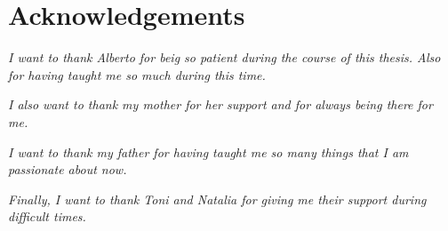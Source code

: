 \section*{Acknowledgements}

\textit{I want to thank Alberto for beig so patient during the course of this thesis. Also for having taught me so much during this time.}

\textit{I also want to thank my mother for her support and for always being there for me.}

\textit{I want to thank my father for having taught me so many things that I am passionate about now.}

\textit{Finally, I want to thank Toni and Natalia for giving me their support during difficult times.}
\thispagestyle{empty}
\newpage